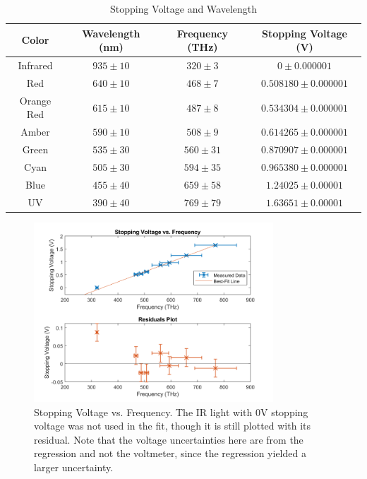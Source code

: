 \begin{table}[H]
    \centering
    \caption{Stopping Voltage and Wavelength}
    \label{tab:results1}
    \begin{tabular}{|c|c|c|c|}
        \hline
        Color      & Wavelength (nm) & Frequency (THz) & Stopping Voltage (V)    \\ \hline
        Infrared   & $935\pm10$      & $320\pm3$       & $0\pm0.000001$          \\ \hline
        Red        & $640\pm10$      & $468\pm7$       & $0.508180 \pm 0.000001$ \\ \hline
        Orange Red & $615\pm10$      & $487\pm8$       & $0.534304 \pm 0.000001$ \\ \hline
        Amber      & $590\pm10$      & $508\pm9$       & $0.614265 \pm 0.000001$ \\ \hline
        Green      & $535\pm30$      & $560\pm31$      & $0.870907 \pm 0.000001$ \\ \hline
        Cyan       & $505\pm30$      & $594\pm35$      & $0.965380 \pm 0.000001$ \\ \hline
        Blue       & $455\pm40$      & $659\pm58$      & $1.24025 \pm 0.00001$   \\ \hline
        UV         & $390\pm40$      & $769\pm79$      & $1.63651 \pm 0.00001$   \\ \hline
    \end{tabular}
\end{table}
\begin{figure}
    \centering
    \includegraphics[width=0.8\textwidth]{Results/Part1/Frequency_vs_Stopping_Voltage.png}
    \caption{Stopping Voltage vs. Frequency. The IR light with 0V stopping voltage was not used in the fit, though it is still plotted with its residual. Note that the voltage uncertainties here are from the regression and not the voltmeter, since the regression yielded a larger uncertainty.}
    \label{fig:frequency_vs_voltage}
\end{figure}

